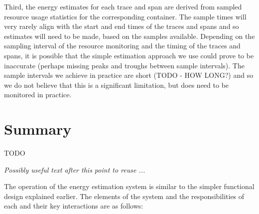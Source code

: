 Third, the energy estimates for each trace and span are derived from sampled resource usage statistics for the corresponding container.  The sample times will very rarely align with the start and end times of the traces and spans and so estimates will need to be made, based on the samples available.  Depending on the sampling interval of the resource monitoring and the timing of the traces and spans, it is possible that the simple estimation approach we use could prove to be inaccurate (perhaps missing peaks and troughs between sample intervals).  The sample intervals we achieve in practice are short (TODO - HOW LONG?) and so we do not believe that this is a significant limitation, but does need to be monitored in practice.

\section{Summary}

TODO

\textit{Possibly useful text after this point to reuse ...}



The operation of the energy estimation system is similar to the simpler functional design explained earlier.  The elements of the system and the responsibilities of each and their key interactions are as follows:

